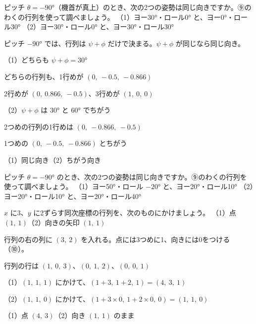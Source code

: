 \begin{reidai}[ジンバルロックを確かめる]
ピッチ $\theta=-90°$（機首が真上）のとき、次の2つの姿勢は同じ向きですか。⑨のわくの行列を使って調べましょう。\newline
（1）\nobreak ヨー30°・ロール0° と、ヨー0°・ロール30°\newline
（2）\nobreak ヨー30°・ロール0° と、ヨー30°・ロール30°\par
\kangaekata ピッチ $-90°$ では、行列は $\psi+\phi$ だけで決まる。$\psi+\phi$ が同じなら同じ向き。\par
\shiki （1）\nobreak どちらも $\psi+\phi=30°$\par
\kviihq \phantom{（1）}どちらの行列も、1行めが $(0,\ -0.5,\ -0.866)$\par
\kviihq \phantom{（1）}2行めが $(0,\ 0.866,\ -0.5)$、3行めが $(1,\ 0,\ 0)$\par
\kviihq （2）\nobreak $\psi+\phi$ は $30°$ と $60°$ でちがう\par
\kviihq \phantom{（2）}2つめの行列の1行めは $(0,\ -0.866,\ -0.5)$\par
\kviihq \phantom{（2）}1つめの $(0,\ -0.5,\ -0.866)$ とちがう\par
\kotae （1）\nobreak 同じ向き\quad（2）\nobreak ちがう向き
\end{reidai}

\begin{jibun}
ピッチ $\theta=-90°$ のとき、次の2つの姿勢は同じ向きですか。⑨のわくの行列を使って調べましょう。\newline
（1）\nobreak ヨー50°・ロール $-20°$ と、ヨー20°・ロール10°\newline
（2）\nobreak ヨー20°・ロール10° と、ヨー20°・ロール40°
\end{jibun}

\begin{reidai}[ずらす行列と、位置・向き]
$x$ に3、$y$ に2ずらす同次座標の行列を、次のものにかけましょう。\newline
（1）\nobreak 点 $(1,\ 1)$\quad（2）\nobreak 向きの矢印 $(1,\ 1)$\par
\kangaekata 行列の右の列に $(3,\ 2)$ を入れる。点には3つめに1、向きには0をつける（⑩）。\par
\shiki 行列の行は $(1,\ 0,\ 3)$、$(0,\ 1,\ 2)$、$(0,\ 0,\ 1)$\par
\kviihq （1）\nobreak $(1,\ 1,\ 1)$ にかけて、$(1+3,\ 1+2,\ 1)=(4,\ 3,\ 1)$\par
\kviihq （2）\nobreak $(1,\ 1,\ 0)$ にかけて、$(1+3\times0,\ 1+2\times0,\ 0)=(1,\ 1,\ 0)$\par
\kotae （1）\nobreak 点 $(4,\ 3)$\quad（2）\nobreak 向き $(1,\ 1)$ のまま
\end{reidai}

